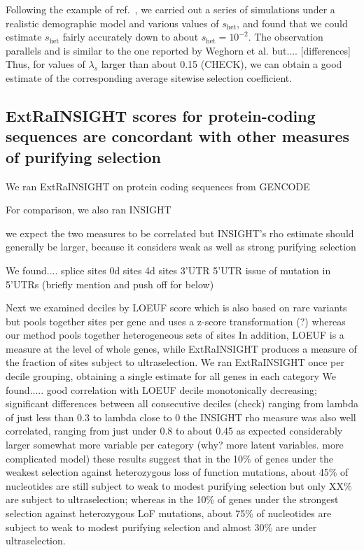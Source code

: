 \documentclass[11pt]{article}
\begin{document}
Following the example of ref.\ \cite{WEGHETAL19}, we carried out a series of simulations 
under a realistic demographic model  and various values of $s_{\text{het}}$, 
and found that we could estimate $s_{\text{het}}$ fairly accurately down to about $s_{\text{het}} = 10^{-2}$.
The observation parallels and is similar to the one reported by Weghorn et al. but.... [differences]
Thus, for values of $\lambda_s$ larger than about 0.15 (CHECK), we can obtain a good estimate of the corresponding average sitewise selection coefficient.

\subsection*{ExtRaINSIGHT scores for protein-coding sequences are concordant with other measures of purifying selection}

We ran ExtRaINSIGHT on protein coding sequences from GENCODE

For comparison, we also ran INSIGHT

we expect the two measures to be correlated
but INSIGHT's rho estimate should generally be larger, because it considers weak as well as strong purifying selection


We found....
splice sites
0d sites
4d sites
3'UTR
5'UTR
issue of mutation in 5'UTRs (briefly mention and push off for below)



Next we examined
deciles by LOEUF score
which is also based on rare variants but pools together sites per gene
and uses a z-score transformation (?)
whereas our method pools together heterogeneous sets of sites
In addition, LOEUF is a measure at the level of whole genes, while ExtRaINSIGHT produces a measure of the fraction of sites subject to ultraselection.
We ran ExtRaINSIGHT once per decile grouping, obtaining a single estimate for all genes in each category
We found.....
good correlation with LOEUF decile
monotonically decreasing; significant differences between all consecutive deciles (check)
ranging from lambda of just less than 0.3 to lambda close to 0
the INSIGHT rho measure was also well correlated, ranging from just under 0.8 to about 0.45
as expected considerably larger
somewhat more variable per category (why?  more latent variables.  more complicated model)
these results suggest that in the 10\% of genes under the weakest selection against heterozygous loss of function mutations,
about 45\% of nucleotides are still subject to weak to modest purifying selection but only XX\% are subject to ultraselection;
whereas in the 10\% of genes under the strongest selection against heterozygous LoF mutations, about 75\% of nucleotides are subject to weak to modest purifying selection and almost 30\% are under ultraselection.  
\end{document}
